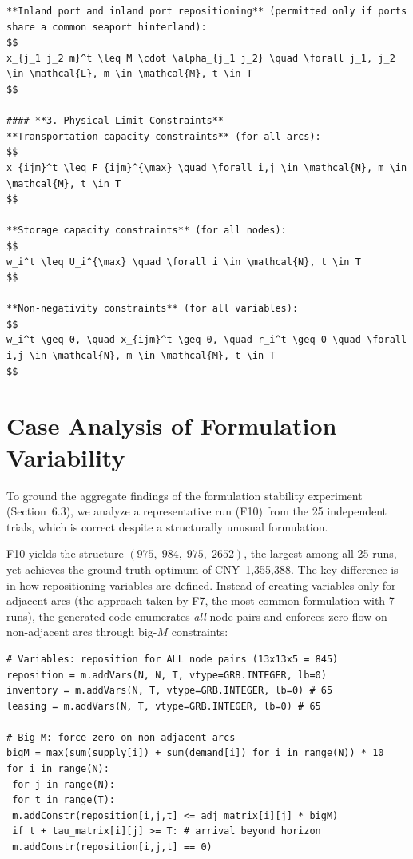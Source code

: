\documentclass[preprint,12pt]{elsarticle}
\begin{document}
\begin{nolinenumbers}
\begin{promptbox}
\begin{lstlisting}[style=prompttemplate]
**Inland port and inland port repositioning** (permitted only if ports share a common seaport hinterland):
$$
x_{j_1 j_2 m}^t \leq M \cdot \alpha_{j_1 j_2} \quad \forall j_1, j_2 \in \mathcal{L}, m \in \mathcal{M}, t \in T
$$

#### **3. Physical Limit Constraints**
**Transportation capacity constraints** (for all arcs):
$$
x_{ijm}^t \leq F_{ijm}^{\max} \quad \forall i,j \in \mathcal{N}, m \in \mathcal{M}, t \in T
$$

**Storage capacity constraints** (for all nodes):
$$
w_i^t \leq U_i^{\max} \quad \forall i \in \mathcal{N}, t \in T
$$

**Non-negativity constraints** (for all variables):
$$
w_i^t \geq 0, \quad x_{ijm}^t \geq 0, \quad r_i^t \geq 0 \quad \forall i,j \in \mathcal{N}, m \in \mathcal{M}, t \in T
$$

\end{lstlisting}
\end{promptbox}
\label{lst:ecr-mathematical-model}
\end{nolinenumbers}

\section{Case Analysis of Formulation Variability}\label{app4}

To ground the aggregate findings of the formulation stability experiment (Section~6.3), we analyze a representative run (F10) from the 25 independent trials, which is correct despite a structurally unusual formulation.

F10 yields the structure $(975,\;984,\;975,\;2652)$, the largest among all 25 runs, yet achieves the ground-truth optimum of CNY~1,355,388. The key difference is in how repositioning variables are defined. Instead of creating variables only for adjacent arcs (the approach taken by F7, the most common formulation with 7 runs), the generated code enumerates \emph{all} node pairs and enforces zero flow on non-adjacent arcs through big-$M$ constraints:

\begin{nolinenumbers}
\begin{promptbox}
\begin{lstlisting}[style=prompttemplate]
# Variables: reposition for ALL node pairs (13x13x5 = 845)
reposition = m.addVars(N, N, T, vtype=GRB.INTEGER, lb=0)
inventory = m.addVars(N, T, vtype=GRB.INTEGER, lb=0) # 65
leasing = m.addVars(N, T, vtype=GRB.INTEGER, lb=0) # 65

# Big-M: force zero on non-adjacent arcs
bigM = max(sum(supply[i]) + sum(demand[i]) for i in range(N)) * 10
for i in range(N):
 for j in range(N):
 for t in range(T):
 m.addConstr(reposition[i,j,t] <= adj_matrix[i][j] * bigM)
 if t + tau_matrix[i][j] >= T: # arrival beyond horizon
 m.addConstr(reposition[i,j,t] == 0)
\end{lstlisting}
\end{promptbox}
\label{lst:case-a-expanded}
\end{nolinenumbers}
\end{document}
